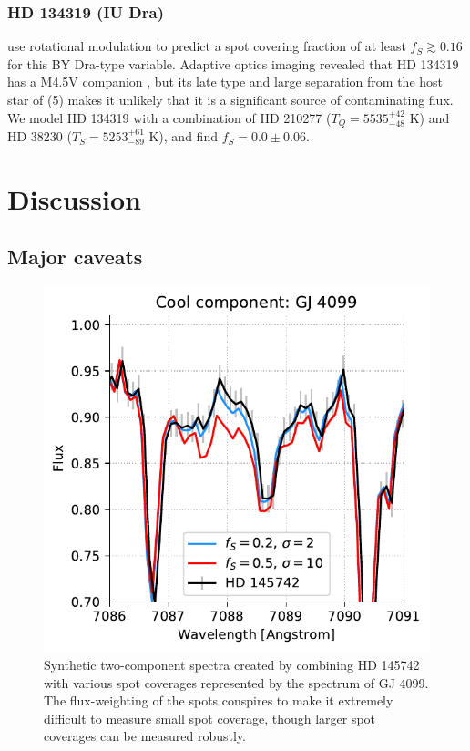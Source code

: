 \subsubsection{HD 134319 (IU Dra)} \label{sec:iudra}

\citet{Messina1998} use rotational modulation to predict a spot covering fraction of at least $f_S \gtrsim 0.16$ for this BY Dra-type variable. Adaptive optics imaging revealed that HD 134319 has a M4.5V companion \citep{Mugrauer2004}, but its late type and large separation from the host star of (5) makes it unlikely that it is a significant source of contaminating flux. We model HD 134319 with a combination of HD 210277 ($T_Q = 5535^{+42}_{-48}$ K) and HD 38230 ($T_S = 5253^{+61}_{-89}$ K), and find $f_S = 0.0 \pm 0.06$.

\section{Discussion} \label{sec:discuss}

\subsection{Major caveats}

\begin{figure}
    \centering
    \includegraphics[scale=0.7]{freckles/demo2.pdf}
    \caption{Synthetic two-component spectra created by combining HD 145742 with various spot coverages represented by the spectrum of GJ 4099. The flux-weighting of the spots conspires to make it extremely difficult to measure small spot coverage, though larger spot coverages can be measured robustly.}
    \label{fig:demo2}
\end{figure}

